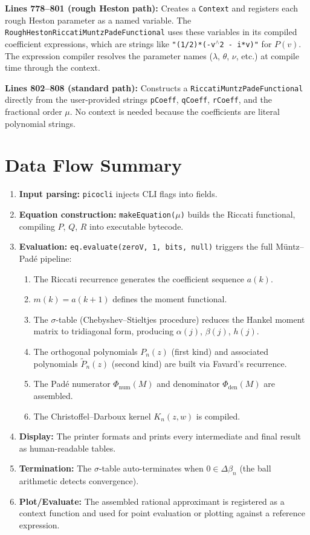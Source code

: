 \documentclass[a4paper,11pt]{article}
\begin{document}
\textbf{Lines 778--801 (rough Heston path):} Creates a \texttt{Context} and
registers each rough Heston parameter as a named variable. The
\texttt{RoughHestonRiccatiMuntzPadeFunctional} uses these variables in its
compiled coefficient expressions, which are strings like
\texttt{"(1/2)*(-v$^\wedge$2 - i*v)"} for $P(v)$. The expression compiler
resolves the parameter names ($\lambda$, $\theta$, $\nu$, etc.) at compile
time through the context.

\textbf{Lines 802--808 (standard path):} Constructs a
\texttt{RiccatiMuntzPadeFunctional} directly from the user-provided strings
\texttt{pCoeff}, \texttt{qCoeff}, \texttt{rCoeff}, and the fractional order
$\mu$. No context is needed because the coefficients are literal polynomial
strings.

\section{Data Flow Summary}

\begin{enumerate}
\item \textbf{Input parsing:} \texttt{picocli} injects CLI flags into fields.
\item \textbf{Equation construction:} \texttt{makeEquation($\mu$)} builds the
  Riccati functional, compiling $P$, $Q$, $R$ into executable bytecode.
\item \textbf{Evaluation:} \texttt{eq.evaluate(zeroV, 1, bits, null)} triggers
  the full M\"untz--Pad\'e pipeline:
  \begin{enumerate}
  \item The Riccati recurrence generates the coefficient sequence $a(k)$.
  \item $m(k) = a(k+1)$ defines the moment functional.
  \item The $\sigma$-table (Chebyshev--Stieltjes procedure) reduces the Hankel
    moment matrix to tridiagonal form, producing $\alpha(j)$, $\beta(j)$, $h(j)$.
  \item The orthogonal polynomials $P_n(z)$ (first kind) and associated
    polynomials $\tilde P_n(z)$ (second kind) are built via Favard's recurrence.
  \item The Pad\'e numerator $\Phi_{\text{num}}(M)$ and denominator
    $\Phi_{\text{den}}(M)$ are assembled.
  \item The Christoffel--Darboux kernel $K_n(z,w)$ is compiled.
  \end{enumerate}
\item \textbf{Display:} The printer formats and prints every intermediate and
  final result as human-readable tables.
\item \textbf{Termination:} The $\sigma$-table auto-terminates when
  $0 \in \Delta\beta_n$ (the ball arithmetic detects convergence).
\item \textbf{Plot/Evaluate:} The assembled rational approximant is registered
  as a context function and used for point evaluation or plotting against a
  reference expression.
\end{enumerate}
\end{document}
